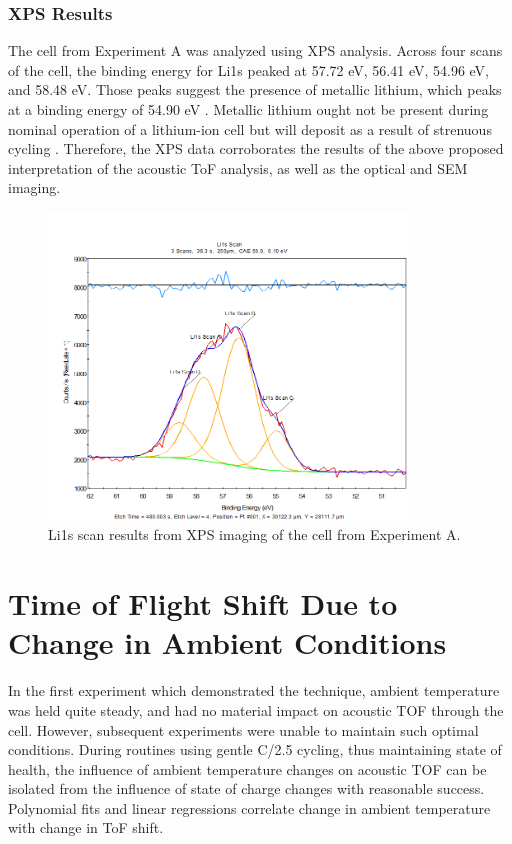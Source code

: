 \subsubsection{XPS Results}
The cell from Experiment A was analyzed using XPS analysis. Across four scans of the cell, the binding energy for Li1s peaked at 57.72 eV, 56.41 eV, 54.96 eV, and 58.48 eV. Those peaks suggest the presence of metallic lithium, which peaks at a binding energy of 54.90 eV \cite{NIST}. Metallic lithium ought not be present during nominal operation of a lithium-ion cell but will deposit as a result of strenuous cycling \cite{lithium}. Therefore, the XPS data corroborates the results of the above proposed interpretation of the acoustic ToF analysis, as well as the optical and SEM imaging.

\begin{figure}[h!]\label{fig:xps}
    \includegraphics[width=0.85\textwidth]{Thesis/xps.png}
    \centering
    \caption{Li1s scan results from XPS imaging of the cell from Experiment A.}
\end{figure}

\section{Time of Flight Shift Due to Change in Ambient Conditions}
In the first experiment which demonstrated the technique, ambient temperature was held quite steady, and had no material impact on acoustic TOF through the cell. 
However, subsequent experiments were unable to maintain such optimal conditions.
During routines using gentle C/2.5 cycling, thus maintaining state of health, the influence of ambient temperature changes on acoustic TOF can be isolated from the influence of state of charge changes with reasonable success. 
Polynomial fits and linear regressions correlate change in ambient temperature with change in ToF shift. 

